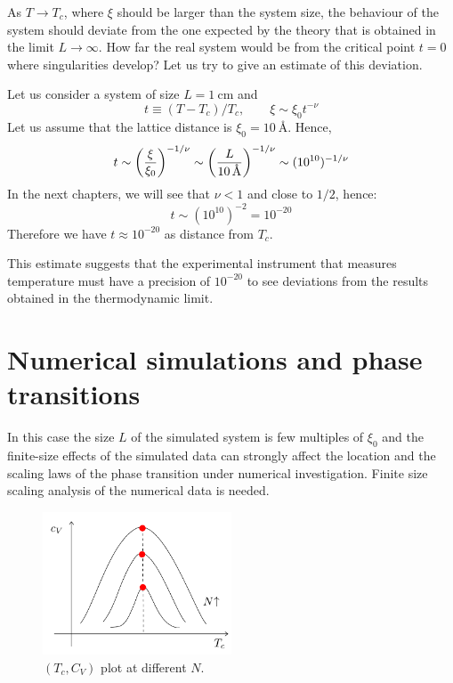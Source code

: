 \documentclass[../main/main.tex]{subfiles}
\begin{document}
As \( T \rightarrow T_c \), where \( \xi  \) should be larger than the system size, the behaviour of the system should deviate from the one expected by the theory that is obtained in the limit \( L \rightarrow \infty  \). How far the real system would be from the critical point \( t=0 \) where singularities develop? Let us try to give an estimate of this deviation.

 Let us consider a system of size \( L = \SI{1}{\cm}  \) and
\begin{equation*}
  t \equiv (T-T_c)/T_c, \qquad \xi \sim \xi _0 t^{-\nu }
\end{equation*}
Let us assume that the lattice distance is \( \xi _0 = \SI{10}{\angstrom}  \). Hence,
 \begin{equation}
   t \sim \qty(\frac{\xi }{\xi _0})^{-1/\nu } \sim \qty(\frac{L}{\SI{10}{\angstrom} })^{-1/\nu } \sim (10^{10})^{-1/\nu }
 \end{equation}
In the next chapters, we will see that \( \nu < 1 \) and close to \( 1/2 \), hence:
\begin{equation*}
  t \sim (10^{10})^{-2 } = 10^{-20}
\end{equation*}
Therefore we have \( t \approx 10^{-20} \)  as distance from \( T_c \).

This estimate suggests that the experimental instrument that measures temperature must have a precision of \( 10^{-20} \)  to see deviations from the results obtained in the thermodynamic limit.


\clearpage

\section{Numerical simulations and phase transitions}

In this case the size \( L \) of the simulated system is few multiples of \( \xi _0 \) and the finite-size effects of the simulated data can strongly affect the location and the scaling laws of the phase transition under numerical investigation.
Finite size scaling analysis of the numerical data is needed.

\begin{figure}[h!]
\centering
\includegraphics[width=0.5\textwidth]{../lessons/5_image/2.pdf}
\caption{\label{fig:5_2} \( (T_c,C_V) \) plot at different \( N \).}
\end{figure}
\end{document}
